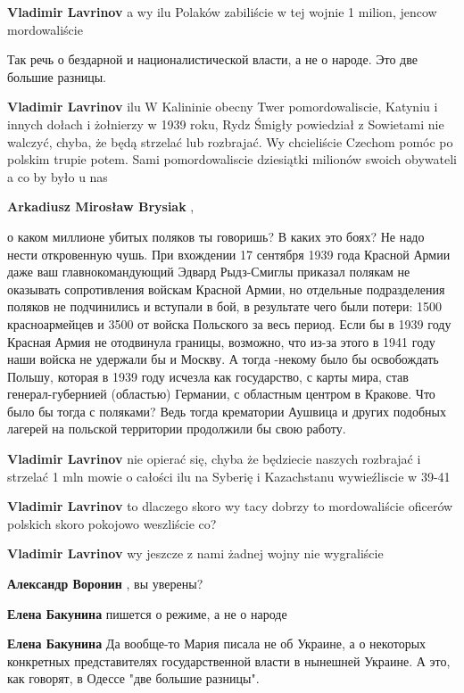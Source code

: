 \begin{itemize}
\begin{itemize}
\textbf{Vladimir Lavrinov} a wy ilu Polaków zabiliście w tej wojnie 1 milion, jencow mordowaliście

Так речь о бездарной и националистической власти, а не о народе. Это две большие разницы.

\textbf{Vladimir Lavrinov} ilu W Kalininie obecny Twer pomordowaliscie, Katyniu i innych dołach i żołnierzy w 1939 roku, Rydz Śmigły powiedział z Sowietami nie walczyć, chyba, że będą strzelać lub rozbrajać. Wy chcieliście Czechom pomóc po polskim trupie potem. Sami pomordowaliscie dziesiątki milionów swoich obywateli a co by było u nas

\textbf{Arkadiusz Mirosław Brysiak} , 

о каком миллионе убитых поляков ты говоришь? В каких это боях? Не надо нести
откровенную чушь. При вхождении 17 сентября 1939 года Красной Армии даже ваш
главнокомандующий Эдвард Рыдз-Смиглы приказал полякам не оказывать
сопротивления войскам Красной Армии, но отдельные подразделения поляков не
подчинились и вступали в бой, в результате чего были потери: 1500
красноармейцев и 3500 от войска Польского за весь период. Если бы в 1939 году
Красная Армия не отодвинула границы, возможно, что из-за этого в 1941 году наши
войска не удержали бы и Москву. А тогда -некому было бы освобождать Польшу,
которая в 1939 году исчезла как государство, с карты мира, став
генерал-губернией (областью) Германии, с областным центром в Кракове. Что было
бы тогда с поляками? Ведь тогда крематории Аушвица и других подобных лагерей на
польской территории продолжили бы свою работу.

\textbf{Vladimir Lavrinov} nie opierać się, chyba że będziecie naszych rozbrajać i strzelać 1 mln mowie o całości ilu na Syberię i Kazachstanu wywieźliscie w 39-41

\textbf{Vladimir Lavrinov} to dlaczego skoro wy tacy dobrzy to mordowaliście oficerów polskich skoro pokojowo weszliście co?

\textbf{Vladimir Lavrinov} wy jeszcze z nami żadnej wojny nie wygraliście

\textbf{Александр Воронин} , вы уверены?

\textbf{Елена Бакунина} пишется о режиме, а не о народе

\textbf{Елена Бакунина} Да вообще-то Мария писала не об Украине, а о некоторых конкретных представителях государственной власти в нынешней Украине. А это, как говорят, в Одессе "две большие разницы".


\end{itemize}
\end{itemize}
